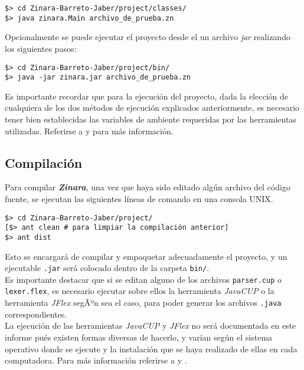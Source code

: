 \documentclass[12pt, spanish]{report}
\begin{document}
\begin{verbatim}
$> cd Zinara-Barreto-Jaber/project/classes/
$> java zinara.Main archivo_de_prueba.zn
\end{verbatim}

Opcionalmente se puede ejecutar el proyecto desde el un archivo
\emph{jar} realizando los siguientes pasos:

\begin{verbatim}
$> cd Zinara-Barreto-Jaber/project/bin/
$> java -jar zinara.jar archivo_de_prueba.zn
\end{verbatim}


Es importante recordar que para la ejecuci\'on del proyecto, dada la
elecci\'on de cualquiera de los dos métodos de ejecuci\'on explicados
anteriormente, es necesario tener bien establecidas las variables de
ambiente requeridas por las herramientas utilizadas. Referirse a
\cite{javacup} y \cite{jflex} para m\'as informaci\'on.

\subsection{Compilaci\'on}
\label{sec:compilacion}
Para compilar \emph{\textbf{Zinara}}, una vez que haya sido editado
algún archivo del c\'odigo fuente, se ejecutan las siguientes l\'ineas de
comando en una consola UNIX.

\begin{verbatim}
$> cd Zinara-Barreto-Jaber/project/
[$> ant clean # para limpiar la compilación anterior]
$> ant dist
\end{verbatim}

Esto se encargar\'a de compilar y empaquetar adecuadamente el proyecto,
y un ejecutable \texttt{.jar} ser\'a colocado dentro de la carpeta
\texttt{bin/}.\\

Es importante destacar que si se editan alguno de los archivos
\texttt{parser.cup} o \texttt{lexer.flex}, es necesario ejecutar sobre
ellos la herramienta \emph{JavaCUP} o la herramienta \emph{JFlex}
segÃºn sea el caso, para poder generar los archivos \texttt{.java}
correspondientes.\\

La ejecuci\'on de las herramientas \emph{JavaCUP} y \emph{JFlex} no ser\'a
documentada en este informe pués existen formas diversas de hacerlo, y
var\'ian según el sistema operativo donde se ejecute y la instalaci\'on
que se haya realizado de ellas en cada computadora. Para m\'as
informaci\'on referirse a \cite{javacup} y \cite{jflex}.\\
\end{document}

